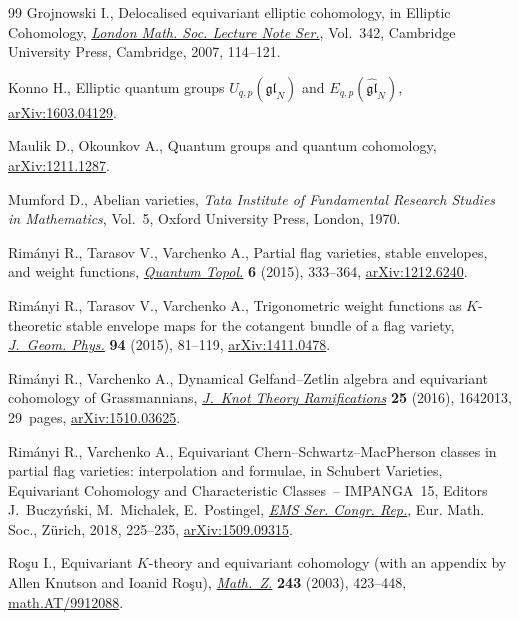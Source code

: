 \documentclass[pdftex]{sigma}
\numberwithin{equation}{section}
\begin{document}
\begin{thebibliography}{99}
Grojnowski I., Delocalised equivariant elliptic cohomology, in Elliptic
 Cohomology, \href{https://doi.org/10.1017/CBO9780511721489.007}{\textit{London Math. Soc. Lecture Note Ser.}}, Vol.~342, Cambridge
 University Press, Cambridge, 2007, 114--121.

Konno H., Elliptic quantum groups $U_{q,p}(\widehat{{\mathfrak{gl}}}_N)$ and
 $E_{q,p}(\widehat{{\mathfrak{gl}}}_N)$, \href{https://arxiv.org/abs/1603.04129}{arXiv:1603.04129}.

Maulik D., Okounkov A., Quantum groups and quantum cohomology,
 \href{https://arxiv.org/abs/1211.1287}{arXiv:1211.1287}.

Mumford D., Abelian varieties, \textit{Tata Institute of Fundamental Research
 Studies in Mathematics}, Vol.~5, Oxford University Press, London, 1970.

Rim\'{a}nyi R., Tarasov V., Varchenko A., Partial flag varieties, stable
 envelopes, and weight functions, \href{https://doi.org/10.4171/QT/65}{\textit{Quantum Topol.}} \textbf{6} (2015),
 333--364, \href{https://arxiv.org/abs/1212.6240}{arXiv:1212.6240}.

Rim\'{a}nyi R., Tarasov V., Varchenko A., Trigonometric weight functions as
 {$K$}-theoretic stable envelope maps for the cotangent bundle of a flag
 variety, \href{https://doi.org/10.1016/j.geomphys.2015.04.002}{\textit{J.~Geom. Phys.}} \textbf{94} (2015), 81--119,
 \href{https://arxiv.org/abs/1411.0478}{arXiv:1411.0478}.

Rim\'{a}nyi R., Varchenko A., Dynamical {G}elfand--{Z}etlin algebra and
 equivariant cohomology of {G}rassman\-nians, \href{https://doi.org/10.1142/S021821651642013X}{\textit{J.~Knot Theory
 Ramifications}} \textbf{25} (2016), 1642013, 29~pages, \href{https://arxiv.org/abs/1510.03625}{arXiv:1510.03625}.

Rim\'{a}nyi R., Varchenko A., Equivariant {C}hern--{S}chwartz--{M}ac{P}herson
 classes in partial flag varieties: inter\-po\-lation and formulae, in Schubert
 Varieties, Equivariant Cohomology and Characteristic Classes~-- {IMPANGA}~15,
 Editors J.~Buczy\'nski, M.~Michalek, E.~Postingel, \href{https://doi.org/10.4171/182-1/10}{\textit{EMS Ser. Congr. Rep.}}, Eur.
 Math. Soc., Z\"{u}rich, 2018, 225--235, \href{https://arxiv.org/abs/1509.09315}{arXiv:1509.09315}.

Ro\c{s}u I., Equivariant {$K$}-theory and equivariant cohomology (with an appendix
 by {A}llen {K}nutson and {I}oanid {R}o\c{s}u), \href{https://doi.org/10.1007/s00209-002-0447-1}{\textit{Math.~Z.}} \textbf{243}
 (2003), 423--448, \href{https://arxiv.org/abs/math.AT/9912088}{math.AT/9912088}.


\end{thebibliography}
\end{document}
